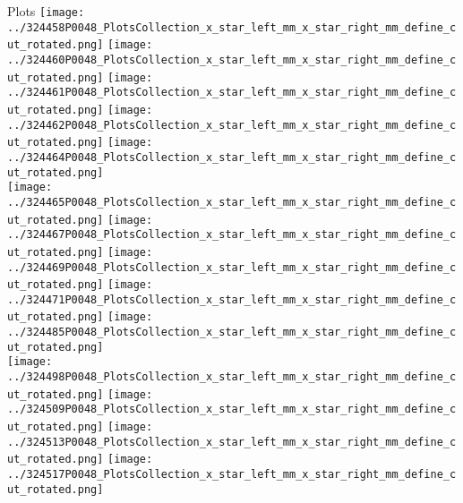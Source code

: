 \documentclass{beamer}
\begin{document}
\begin{frame}\tiny
        \begin{block}{Plots}
		  \centering
                \texttt{[image: ../324458P0048\_PlotsCollection\_x\_star\_left\_mm\_x\_star\_right\_mm\_define\_cut\_rotated.png]}
                \texttt{[image: ../324460P0048\_PlotsCollection\_x\_star\_left\_mm\_x\_star\_right\_mm\_define\_cut\_rotated.png]}
                \texttt{[image: ../324461P0048\_PlotsCollection\_x\_star\_left\_mm\_x\_star\_right\_mm\_define\_cut\_rotated.png]}
                \texttt{[image: ../324462P0048\_PlotsCollection\_x\_star\_left\_mm\_x\_star\_right\_mm\_define\_cut\_rotated.png]}
                \texttt{[image: ../324464P0048\_PlotsCollection\_x\_star\_left\_mm\_x\_star\_right\_mm\_define\_cut\_rotated.png]}\\
                \texttt{[image: ../324465P0048\_PlotsCollection\_x\_star\_left\_mm\_x\_star\_right\_mm\_define\_cut\_rotated.png]}
                \texttt{[image: ../324467P0048\_PlotsCollection\_x\_star\_left\_mm\_x\_star\_right\_mm\_define\_cut\_rotated.png]}
                \texttt{[image: ../324469P0048\_PlotsCollection\_x\_star\_left\_mm\_x\_star\_right\_mm\_define\_cut\_rotated.png]}
                \texttt{[image: ../324471P0048\_PlotsCollection\_x\_star\_left\_mm\_x\_star\_right\_mm\_define\_cut\_rotated.png]}
                \texttt{[image: ../324485P0048\_PlotsCollection\_x\_star\_left\_mm\_x\_star\_right\_mm\_define\_cut\_rotated.png]}\\
                \texttt{[image: ../324498P0048\_PlotsCollection\_x\_star\_left\_mm\_x\_star\_right\_mm\_define\_cut\_rotated.png]}
                \texttt{[image: ../324509P0048\_PlotsCollection\_x\_star\_left\_mm\_x\_star\_right\_mm\_define\_cut\_rotated.png]}
                \texttt{[image: ../324513P0048\_PlotsCollection\_x\_star\_left\_mm\_x\_star\_right\_mm\_define\_cut\_rotated.png]}
                \texttt{[image: ../324517P0048\_PlotsCollection\_x\_star\_left\_mm\_x\_star\_right\_mm\_define\_cut\_rotated.png]}

\end{block}
\end{frame}
\end{document}
